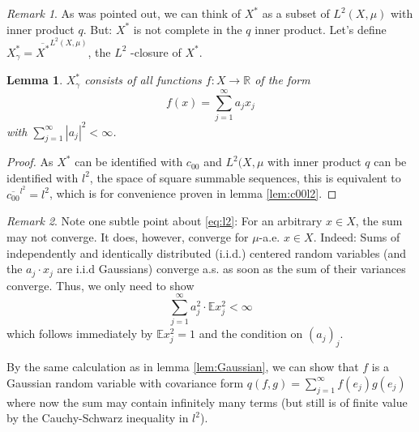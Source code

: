 \documentclass{scrartcl}
\newtheorem{lemma}{Lemma}
\theoremstyle{definition}
\theoremstyle{remark}
\newtheorem{remark}{Remark}
\newcommand{\R}{\mathbb R}
\newcommand{\E}{\mathbb E}
\begin{document}
\begin{remark}
As was pointed out, we can think of $X^*$ as a subset of $L^2(X,\mu)$ with inner product $q$. But: $X^*$ is not complete in the $q$ inner product. Let's define $X_\gamma^* = \overline{X^*}^{L^2(X,\mu)}$, the $L^2$ -closure of $X^*$.
\end{remark}
\begin{lemma}
$X_\gamma^*$ consists of all functions $f:X\to \R$ of the form
\begin{equation}\label{eq:l2}
f(x) = \sum_{j=1}^\infty a_j x_j
\end{equation}
with $\sum_{j=1}^\infty |a_j|^2 < \infty$.
\end{lemma}
\begin{proof}
As $X^*$ can be identified with $c_{00}$ and $L^2(X,\mu$ with inner product $q$ can be identified with $l^2$, the space of square summable sequences, this is equivalent to $\overline{c_{00}}^{l^2} = l^2$, which is for convenience proven in lemma \ref{lem:c00l2}.
\end{proof}
\begin{remark}
Note one subtle point about \eqref{eq:l2}: For an arbitrary $x\in X$, the sum may not converge. It does, however, converge for $\mu$-a.e. $x\in X$. Indeed: Sums of independently and identically distributed (i.i.d.) centered random variables (and the $a_j\cdot x_j$ are i.i.d Gaussians) converge a.s. as soon as the sum of their variances converge. Thus, we only need to show
\[ \sum_{j=1}^\infty a_j^2 \cdot \E x_j^2 < \infty \]
which follows immediately by $\E x_j^2 = 1$ and the condition on $(a_j)_j$.

By the same calculation as in lemma \ref{lem:Gaussian}, we can show that $f$ is a Gaussian random variable with covariance form $q(f, g) = \sum_{j=1}^\infty f(e_j)g(e_j)$ where now the sum may contain infinitely many terms (but still is of finite value by the Cauchy-Schwarz inequality in $l^2$).
\end{remark}
\end{document}
